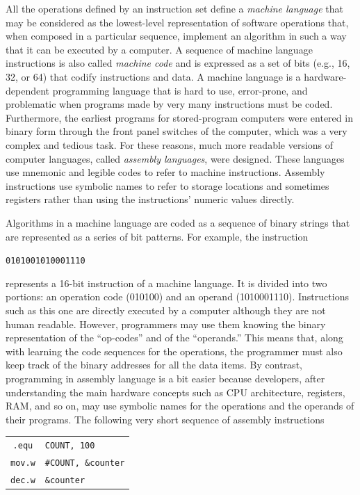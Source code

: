 All the operations defined by an instruction set define a \textit{machine language} that may be considered as the lowest-level representation of software operations that, when composed in a particular sequence, implement an algorithm in such a way that it can be executed by a computer. A sequence of machine language instructions is also called \textit{machine code} and is expressed as a set of bits (e.g., 16, 32, or 64) that codify instructions and data. A machine language is a hardware-dependent programming language that is hard to use, error-prone, and problematic when programs made by very many instructions must be coded. Furthermore, the earliest programs for stored-program computers were entered in binary form through the front panel switches of the computer, which was a very complex and tedious task. For these reasons, much more readable versions of computer languages, called \textit{assembly languages}, were designed. These languages use mnemonic and legible codes to refer to machine instructions. Assembly instructions use symbolic names to refer to storage locations and sometimes registers rather than using the instructions' numeric values directly.

Algorithms in a machine language are coded as a sequence of binary strings that are represented as a series of bit patterns. For example, the instruction
\begin{center}
\texttt{0101001010001110}
\end{center}
\noindent represents a 16-bit instruction of a machine language. It is divided into two portions: an operation code (010100) and an operand (1010001110). Instructions such as this one are directly executed by a computer although they are not human readable. However, programmers may use them knowing the binary representation of the ``op-codes'' and of the ``operands.'' This means that, along with learning the code sequences for the operations, the programmer must also keep track of the binary addresses for all the data items. By contrast, programming in assembly language is a bit easier because developers, after understanding the main hardware concepts such as CPU architecture, registers, RAM, and so on, may use symbolic names for the operations and the operands of their programs. The following very short sequence of assembly instructions

\medskip
\begin{tabular}{cl}

\texttt{.equ} & \texttt{COUNT, 100}\\

\texttt{mov.w} & \texttt{\#COUNT, \&counter}\\

\texttt{dec.w} & \texttt{\&counter}
\end{tabular}

